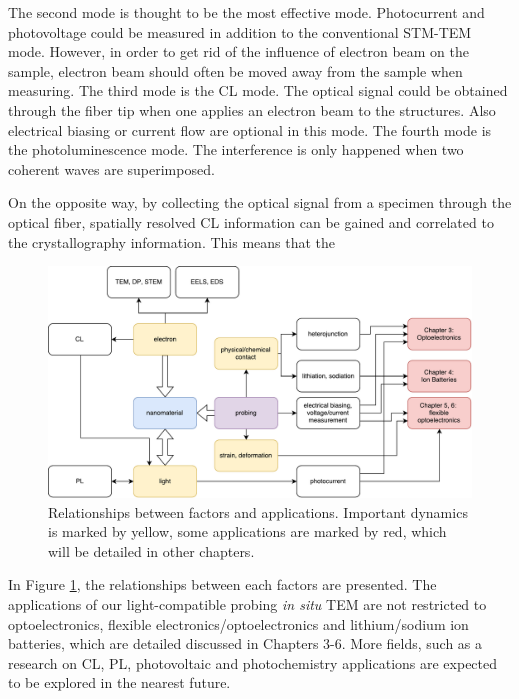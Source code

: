 The second mode is thought to be the most effective mode. Photocurrent and photovoltage could be measured in addition to the conventional STM-TEM mode.
However, in order to get rid of the influence of electron beam on the sample, electron beam should often be moved away from the sample when measuring.
The third mode is the CL mode. The optical signal could be obtained through the fiber tip when one applies an electron beam to the structures. Also electrical biasing or current flow are optional in this mode.
The fourth mode is the photoluminescence mode. The interference is only happened when two coherent waves are superimposed. 

On the opposite way, by collecting the optical signal from a specimen through the optical fiber, spatially resolved CL information can be gained and correlated to the crystallography information. 
This means that the %

\begin{figure}  
\includegraphics[width=\textwidth]{figures/figure2_apply}
\caption[Relationships between factors and applications.]{Relationships between factors and applications. Important dynamics is marked by yellow, some applications are marked by red, which will be detailed in other chapters.
\label{fig:2_apply}}
\end{figure}

In Figure \ref{fig:2_apply}, the relationships between each factors are presented. The applications of our light-compatible probing {\em in situ} TEM are not restricted to optoelectronics, flexible electronics/optoelectronics and lithium/sodium ion batteries, which are detailed discussed in Chapters 3-6. More fields, such as a research on CL, PL, photovoltaic and photochemistry applications are expected to be explored in the nearest future. 

